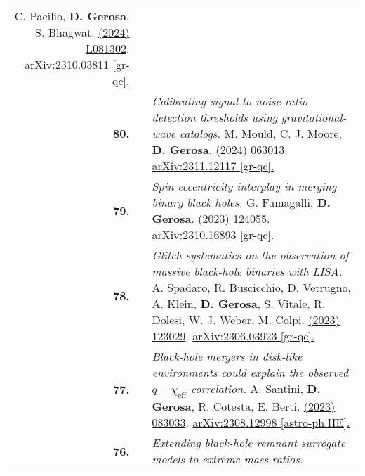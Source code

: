 {\begin{longtable}{rp{0.3cm}p{15.8cm}}
C. Pacilio, \textbf{D. Gerosa}, S. Bhagwat.
\newline{}
\href{https://journals.aps.org/prd/abstract/10.1103/PhysRevD.109.L081302}{\prdl 109 (2024) L081302}. \href{https://arxiv.org/abs/2310.03811}{arXiv:2310.03811 [gr-qc].}
\vspace{0.09cm}\\
%
\textbf{80.} & & \textit{Calibrating signal-to-noise ratio detection thresholds using gravitational-wave catalogs.}
\newline{}
M. Mould, C. J. Moore, \textbf{D. Gerosa}.
\newline{}
\href{https://journals.aps.org/prd/abstract/10.1103/PhysRevD.109.063013}{\prd 109 (2024) 063013}. \href{https://arxiv.org/abs/2311.12117}{arXiv:2311.12117 [gr-qc].}
\vspace{0.09cm}\\
%
\textbf{79.} & & \textit{Spin-eccentricity interplay in merging binary black holes.}
\newline{}
G. Fumagalli, \textbf{D. Gerosa}.
\newline{}
\href{https://journals.aps.org/prd/abstract/10.1103/PhysRevD.108.124055}{\prd 108 (2023) 124055}. \href{https://arxiv.org/abs/2310.16893}{arXiv:2310.16893 [gr-qc].}
\vspace{0.09cm}\\
%
\textbf{78.} & & \textit{Glitch systematics on the observation of massive black-hole binaries with LISA.}
\newline{}
A. Spadaro, R. Buscicchio, D. Vetrugno, A. Klein, \textbf{D. Gerosa}, S. Vitale, R. Dolesi, W. J. Weber, M. Colpi.
\newline{}
\href{https://journals.aps.org/prd/abstract/10.1103/PhysRevD.108.123029}{\prd 108 (2023) 123029}. \href{https://arxiv.org/abs/2306.03923}{arXiv:2306.03923 [gr-qc].}
\vspace{0.09cm}\\
%
\textbf{77.} & & \textit{Black-hole mergers in disk-like environments could explain the observed $q-\chi_\mathrm{eff}$ correlation.}
\newline{}
A. Santini, \textbf{D. Gerosa}, R. Cotesta, E. Berti.
\newline{}
\href{https://journals.aps.org/prd/abstract/10.1103/PhysRevD.108.083033}{\prd 108 (2023) 083033}. \href{https://arxiv.org/abs/2308.12998}{arXiv:2308.12998 [astro-ph.HE].}
\vspace{0.09cm}\\
%
\textbf{76.} & & \textit{Extending black-hole remnant surrogate models to extreme mass ratios.}

\end{longtable}}
